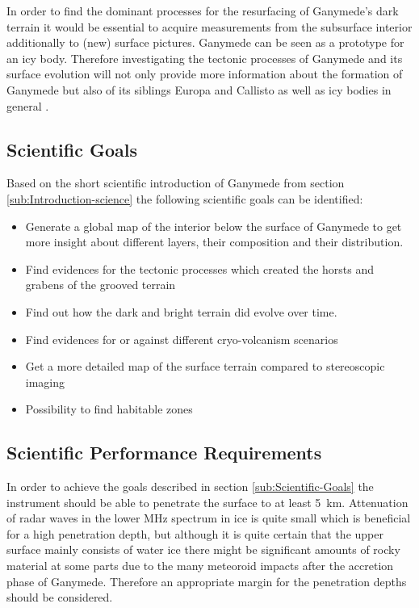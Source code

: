 In order to find the dominant processes for the resurfacing of Ganymede's
dark terrain it would be essential to acquire measurements from the
subsurface interior additionally to (new) surface pictures. Ganymede
can be seen as a prototype for an icy body. Therefore investigating
the tectonic processes of Ganymede and its surface evolution will
not only provide more information about the formation of Ganymede
but also of its siblings Europa and Callisto as well as icy bodies
in general \cite{bagenal2007jupiter}.


\subsection{Scientific Goals\label{sub:Scientific-Goals}}

Based on the short scientific introduction of Ganymede from section
\ref{sub:Introduction-science} the following scientific goals can
be identified:
\begin{itemize}
\item Generate a global map of the interior below the surface of Ganymede
to get more insight about different layers, their composition and
their distribution.
\item Find evidences for the tectonic processes which created the horsts
and grabens of the grooved terrain
\item Find out how the dark and bright terrain did evolve over time.
\item Find evidences for or against different cryo-volcanism scenarios
\item Get a more detailed map of the surface terrain compared to stereoscopic
imaging
\item Possibility to find habitable zones 
\end{itemize}

\subsection{Scientific Performance Requirements}

In order to achieve the goals described in section \ref{sub:Scientific-Goals}
the instrument should be able to penetrate the surface to at least
5~km. Attenuation of radar waves in the lower MHz spectrum in ice
is quite small which is beneficial for a high penetration depth, but
although it is quite certain that the upper surface mainly consists
of water ice there might be significant amounts of rocky material
at some parts due to the many meteoroid impacts after the accretion
phase of Ganymede. Therefore an appropriate margin for the penetration
depths should be considered. 

